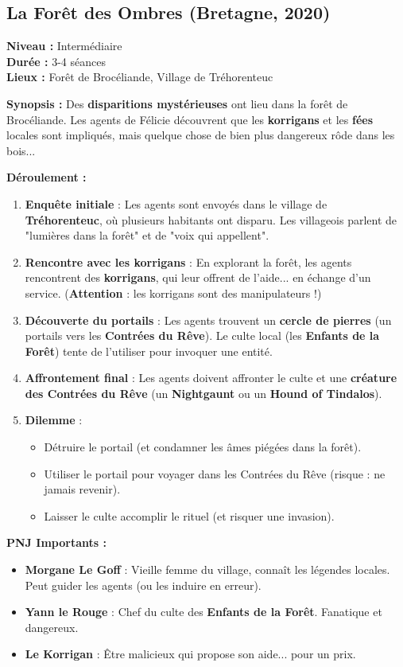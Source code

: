 \documentclass[10pt,a5paper,twoside]{book}
\begin{document}
\subsection{La Forêt des Ombres (Bretagne, 2020)}
\begin{shaded}
\textbf{Niveau :} Intermédiaire \\ \textbf{Durée :} 3-4 séances \\ \textbf{Lieux :} Forêt de Brocéliande, Village de Tréhorenteuc

\textbf{Synopsis :}
Des \textbf{disparitions mystérieuses} ont lieu dans la forêt de Brocéliande. Les agents de Félicie découvrent que les \textbf{korrigans} et les \textbf{fées} locales sont impliqués, mais quelque chose de bien plus dangereux rôde dans les bois...

\textbf{Déroulement :}
\begin{enumerate}
	\item \textbf{Enquête initiale} : Les agents sont envoyés dans le village de \textbf{Tréhorenteuc}, où plusieurs habitants ont disparu. Les villageois parlent de "lumières dans la forêt" et de "voix qui appellent".
	\item \textbf{Rencontre avec les korrigans} : En explorant la forêt, les agents rencontrent des \textbf{korrigans}, qui leur offrent de l'aide... en échange d'un service. (\textbf{Attention} : les korrigans sont des manipulateurs !)
	\item \textbf{Découverte du portails} : Les agents trouvent un \textbf{cercle de pierres} (un portails vers les \textbf{Contrées du Rêve}). Le culte local (les \textbf{Enfants de la Forêt}) tente de l'utiliser pour invoquer une entité.
	\item \textbf{Affrontement final} : Les agents doivent affronter le culte et une \textbf{créature des Contrées du Rêve} (un \textbf{Nightgaunt} ou un \textbf{Hound of Tindalos}).
	\item \textbf{Dilemme} :
	\begin{itemize}
		\item Détruire le portail (et condamner les âmes piégées dans la forêt).
		\item Utiliser le portail pour voyager dans les Contrées du Rêve (risque : ne jamais revenir).
		\item Laisser le culte accomplir le rituel (et risquer une invasion).
	\end{itemize}
\end{enumerate}

\textbf{PNJ Importants :}
	\begin{itemize}
		\item \textbf{Morgane Le Goff} : Vieille femme du village, connaît les légendes locales. Peut guider les agents (ou les induire en erreur).
		\item \textbf{Yann le Rouge} : Chef du culte des \textbf{Enfants de la Forêt}. Fanatique et dangereux.
		\item \textbf{Le Korrigan} : Être malicieux qui propose son aide... pour un prix.
	\end{itemize}


\end{shaded}
\end{document}
